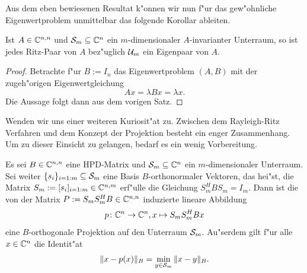 Aus dem eben bewiesenen Resultat k"onnen wir nun f"ur das gew"ohnliche Eigenwertproblem unmittelbar das folgende Korollar
ableiten.

\begin{kor}
Ist $A\in\Cnn$ und $\S_m\subseteq \Cn$ ein $m$-dimensionaler $A$-invarianter Unterraum, so ist
jedes Ritz-Paar von $A$ bez"uglich $\U_m$ ein Eigenpaar von $A$.
\end{kor}

\begin{proof}
Betrachte f"ur $B:=I_n$ das Eigenwertproblem $(A,B)$
mit der zugeh"origen Eigenwertgleichung
\[
Ax = \lambda Bx = \lambda x.
\]
Die Aussage folgt dann aus dem vorigen Satz.
\end{proof}

Wenden wir uns einer weiteren Kuriosit"at zu. Zwischen dem Rayleigh-Ritz Verfahren und dem Konzept der Projektion besteht ein enger Zusammenhang.
Um zu dieser Einsicht zu gelangen, bedarf es ein wenig
Vorbereitung.
\begin{thm}\label{thm:chap3:projektor}
Es sei $B\in\Cnn$ eine HPD-Matrix und $\S_m \subseteq \Cn$ ein $m$-dimensionaler Unterraum. Sei weiter $\{s_i\}_{i=1:m}\subseteq\S_m$ eine
Basis $B$-orthonormaler Vektoren, das hei"st, die Matrix $S_m := [s_i]_{i=1:m}
\in\C^{n,m}$ erf"ulle die Gleichung $S_m^H B S_m = I_m$. Dann ist die von der Matrix
 $P := S_m S_m^H B \in \Cnn$ induzierte lineare Abbildung
\[
p \colon \Cn \to \Cn, x\mapsto S_m S_m^H Bx
\]
eine $B$-orthogonale Projektion auf den Unterraum $\S_m$. Au"serdem gilt
f"ur alle $x\in\Cn$ die Identit"at
\[
\|x-p(x)\|_B = \min_{y\in\S_m} \|x - y\|_B.
\]
\end{thm}

